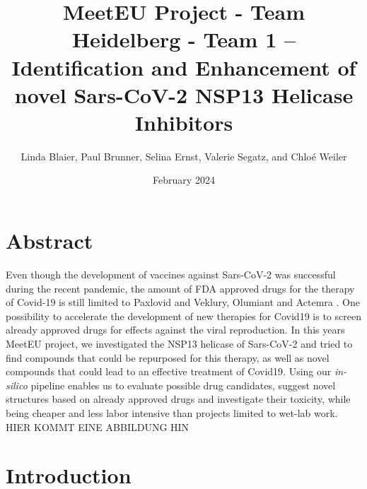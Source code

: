 \documentclass[11pt, letterpaper, titlepage]{article}
\title{MeetEU Project - Team Heidelberg - Team 1 -- \\ Identification and Enhancement of novel Sars-CoV-2 NSP13 Helicase Inhibitors}
\author{Linda Blaier, Paul Brunner, Selina Ernst, Valerie Segatz, and Chlo\'{e} Weiler}
\date{February 2024}
\begin{document}
\maketitle

\ihead{\headmark}
\cfoot{\pagemark}   %

\section{Abstract}
Even though the development of vaccines against Sars-CoV-2 was successful during the recent pandemic, the amount of FDA approved drugs for the therapy of Covid-19 is still limited to Paxlovid and Veklury, Olumiant and Actemra \cite{FDA_COVID}. One possibility to accelerate the development of new therapies for Covid19 is to screen already approved drugs for effects against the viral reproduction. In this years MeetEU project, we investigated the NSP13 helicase of Sars-CoV-2 and tried to find compounds that could be repurposed for this therapy, as well as novel compounds that could lead to an effective treatment of Covid19. Using our \textit{in-silico} pipeline enables us to evaluate possible drug candidates, suggest novel structures based on already approved drugs and investigate their toxicity, while being cheaper and less labor intensive than projects limited to wet-lab work. 
HIER KOMMT EINE ABBILDUNG HIN

\FloatBarrier


\section{Introduction}
\subsection*{}
\end{document}
